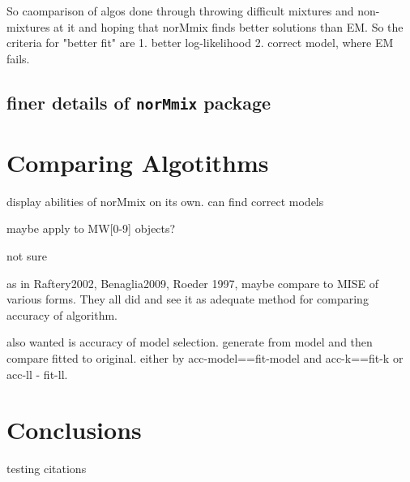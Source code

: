 So caomparison of algos done through throwing difficult mixtures and non-mixtures at it and hoping that norMmix finds better solutions than EM. So the criteria for "better fit" are 1. better log-likelihood 2. correct model, where EM fails.

\section{finer details of {\tt norMmix} package}




\chapter{Comparing Algotithms}

display abilities of norMmix on its own. can find correct models

maybe apply to MW[0-9] objects?

not sure

as in Raftery2002, Benaglia2009, Roeder 1997, maybe compare to MISE of various forms. They all did and see it as adequate method for comparing accuracy of algorithm.

also wanted is accuracy of model selection. generate from model and then compare fitted to original. either by acc-model==fit-model and acc-k==fit-k or acc-ll - fit-ll.


\chapter{Conclusions}

testing citations
\cite{McL00} \cite{Ben09} \cite{Roe97}
